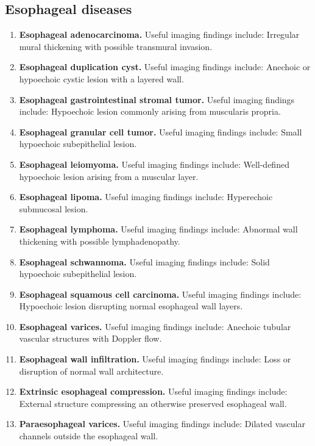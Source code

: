 \subsection{Esophageal diseases}
\begin{enumerate}[leftmargin=*,itemsep=0.45em,topsep=0.4em]
\item \textbf{Esophageal adenocarcinoma.} Useful imaging findings include: Irregular mural thickening with possible transmural invasion.
\item \textbf{Esophageal duplication cyst.} Useful imaging findings include: Anechoic or hypoechoic cystic lesion with a layered wall.
\item \textbf{Esophageal gastrointestinal stromal tumor.} Useful imaging findings include: Hypoechoic lesion commonly arising from muscularis propria.
\item \textbf{Esophageal granular cell tumor.} Useful imaging findings include: Small hypoechoic subepithelial lesion.
\item \textbf{Esophageal leiomyoma.} Useful imaging findings include: Well-defined hypoechoic lesion arising from a muscular layer.
\item \textbf{Esophageal lipoma.} Useful imaging findings include: Hyperechoic submucosal lesion.
\item \textbf{Esophageal lymphoma.} Useful imaging findings include: Abnormal wall thickening with possible lymphadenopathy.
\item \textbf{Esophageal schwannoma.} Useful imaging findings include: Solid hypoechoic subepithelial lesion.
\item \textbf{Esophageal squamous cell carcinoma.} Useful imaging findings include: Hypoechoic lesion disrupting normal esophageal wall layers.
\item \textbf{Esophageal varices.} Useful imaging findings include: Anechoic tubular vascular structures with Doppler flow.
\item \textbf{Esophageal wall infiltration.} Useful imaging findings include: Loss or disruption of normal wall architecture.
\item \textbf{Extrinsic esophageal compression.} Useful imaging findings include: External structure compressing an otherwise preserved esophageal wall.
\item \textbf{Paraesophageal varices.} Useful imaging findings include: Dilated vascular channels outside the esophageal wall.
\end{enumerate}

